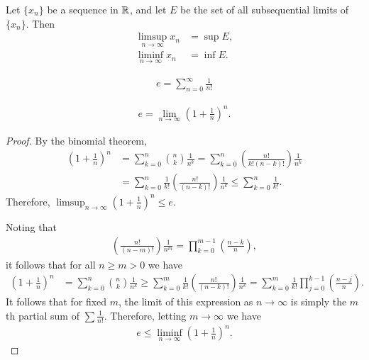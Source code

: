 \begin{defn}
    Let $\{x_n\}$ be a sequence in $\mathbb{R}$, and let $E$ be the set of all subsequential limits of $\{x_n\}$. Then
    \begin{align*}
        \limsup_{n\to\infty} x_n &= \sup E, \\
        \liminf_{n\to\infty} x_n &= \inf E.
    \end{align*}
\end{defn}

\begin{defn}
    \begin{align*}
        e = \sum_{n=0}^{\infty}\frac{1}{n!}
    \end{align*}
\end{defn}

\begin{thm}
    \begin{align*}
        e = \lim_{n\to\infty}\left(1 + \frac{1}{n}\right)^{n}.
    \end{align*}
\end{thm}

\begin{proof}
    By the binomial theorem,
    \begin{align*}
        \left(1 + \frac{1}{n}\right)^{n} &= \sum_{k=0}^{n}\binom{n}{k}\frac{1}{n^k} = \sum_{k=0}^{n}\left(\frac{n!}{k!(n-k)!}\right)\frac{1}{n^k} \\
        &= \sum_{k=0}^{n}\frac{1}{k!}\left(\frac{n!}{(n-k)!}\right)\frac{1}{n^k} \leq \sum_{k=0}^{n}\frac{1}{k!}.
    \end{align*}
    Therefore, $\limsup_{n\to\infty}\left(1 + \frac{1}{n}\right)^{n} \leq e$.
    
    Noting that
    \begin{align*}
        \left(\frac{n!}{(n-m)!}\right)\frac{1}{n^m} = \prod_{k=0}^{m-1}\left(\frac{n-k}{n}\right),
    \end{align*}
    it follows that for all $n \geq m > 0$ we have
    \begin{align*}
        \left(1 + \frac{1}{n}\right)^{n} &= \sum_{k=0}^{n}\binom{n}{k}\frac{1}{n^k} \geq \sum_{k=0}^{m}\frac{1}{k!}\left(\frac{n!}{(n-k)!}\right)\frac{1}{n^k} = \sum_{k=0}^{m}\frac{1}{k!}\prod_{j=0}^{k-1}\left(\frac{n-j}{n}\right).
    \end{align*}
    It follows that for fixed $m$, the limit of this expression as $n \to \infty$ is simply the $m$th partial sum of $\sum \frac{1}{n!}$. Therefore, letting $m \to \infty$ we have
    \begin{align*}
        e \leq \liminf_{n\to\infty}\left(1 + \frac{1}{n}\right)^{n}.
    \end{align*}
\end{proof}

